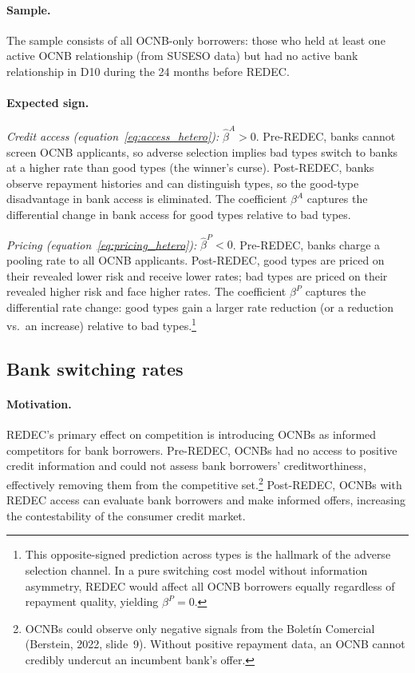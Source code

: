 \documentclass[12pt]{article}
\theoremstyle{plain}
\theoremstyle{plain}
\begin{document}
\paragraph{Sample.} The sample consists of all OCNB-only borrowers: those who held at least one active OCNB relationship (from SUSESO data) but had no active bank relationship in D10 during the 24 months before REDEC.


\paragraph{Expected sign.}

\textit{Credit access (equation~\ref{eq:access_hetero}):} $\hat{\beta}^{A} > 0$. Pre-REDEC, banks cannot screen OCNB applicants, so adverse selection implies bad types switch to banks at a higher rate than good types (the winner's curse). Post-REDEC, banks observe repayment histories and can distinguish types, so the good-type disadvantage in bank access is eliminated. The coefficient $\beta^{A}$ captures the differential change in  bank access for good types relative to bad types.

\textit{Pricing (equation~\ref{eq:pricing_hetero}):} $\hat{\beta}^{P} < 0$. Pre-REDEC, banks charge a pooling rate to all OCNB applicants. Post-REDEC, good types are priced on their revealed lower risk and receive lower rates; bad types are priced on their revealed higher risk and face higher rates. The coefficient $\beta^{P}$ captures the differential rate change: good types gain a larger rate reduction (or a reduction vs.\ an increase) relative to bad types.\footnote{This opposite-signed prediction across types is the hallmark of the adverse selection channel. In a pure switching cost model without information asymmetry, REDEC would affect all OCNB borrowers equally regardless of repayment quality, yielding $\beta^{P} = 0$.}


\subsection{Bank switching rates}

\paragraph{Motivation.} REDEC's primary effect on competition is introducing OCNBs as informed competitors for bank borrowers. Pre-REDEC, OCNBs had no access to positive credit information and could not assess bank borrowers' creditworthiness, effectively removing them from the competitive set.\footnote{OCNBs could observe only negative signals from the Bolet\'in Comercial (Berstein, 2022, slide~9). Without positive repayment data, an OCNB cannot credibly undercut an incumbent bank's offer.} Post-REDEC, OCNBs with REDEC access can evaluate bank borrowers and make informed offers, increasing the contestability of the consumer credit market.
\end{document}
